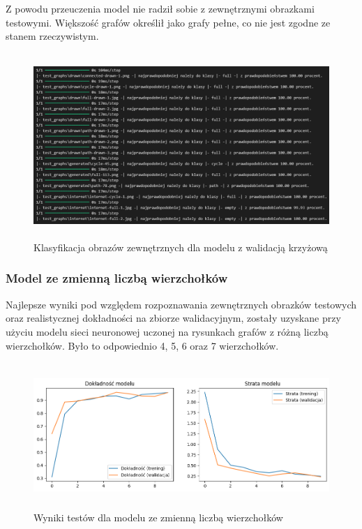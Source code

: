 Z powodu przeuczenia model nie radził sobie z zewnętrznymi obrazkami testowymi.
Większość grafów określił jako grafy pełne, co nie jest zgodne ze stanem rzeczywistym.

\begin{figure}[ht]
	\centering
	\includegraphics[height=7cm]{partials/images/tests/v2_crossvalid_img_tests.png}
	\caption{Klasyfikacja obrazów zewnętrznych dla modelu z walidacją krzyżową}
\label{Fig:GraphUndirected}
\end{figure}
\FloatBarrier

\subsubsection{Model ze zmienną liczbą wierzchołków}
Najlepsze wyniki pod względem rozpoznawania zewnętrznych obrazków testowych
oraz realistycznej dokładności na zbiorze walidacyjnym,
zostały uzyskane przy użyciu modelu sieci neuronowej uczonej na rysunkach grafów z różną liczbą wierzchołków.
Było to odpowiednio 4, 5, 6 oraz 7 wierzchołków.

\begin{figure}[ht]
	\centering
	\includegraphics[height=5.5cm]{partials/images/tests/v2_multiple_edges.png}
	\caption{Wyniki testów dla modelu ze zmienną liczbą wierzchołków}
\label{Fig:GraphUndirected}
\end{figure}
\FloatBarrier

